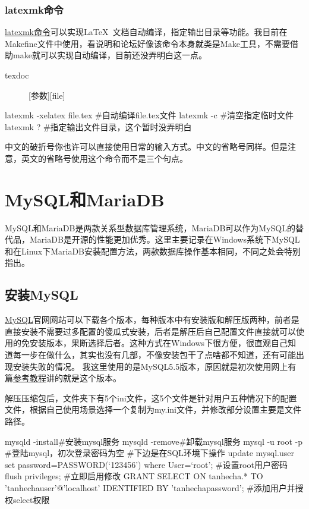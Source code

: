 \subsubsection{latexmk命令}
	\href{https://blog.csdn.net/bleedingfight/article/details/84946793?ops_request_misc=%257B%2522request%255Fid%2522%253A%2522a782193c5e5af7bfb740173a44657da1%2522%252C%2522scm%2522%253A%252220140713.130102334..%2522%257D&request_id=a782193c5e5af7bfb740173a44657da1&biz_id=0&utm_medium=distribute.pc_search_result.none-task-blog-2~all~sobaiduend~default-1-84946793-null-null.142^v101^pc_search_result_base7&utm_term=latexmk&spm=1018.2226.3001.4187}{latexmk命令}可以实现\LaTeX\ 文档自动编译，指定输出目录等功能。我目前在Makefine文件中使用，看说明和论坛好像该命令本身就类是Make工具，不需要借助make就可以实现自动编译，目前还没弄明白这一点。
	\begin{description}
		\item[texdoc] [参数][file]
	\end{description}
\begin{shell}
latexmk -xelatex file.tex #自动编译file.tex文件
latexmk -c #清空指定临时文件
latexmk ? #指定输出文件目录，这个暂时没弄明白
\end{shell}

中文的破折号你也许可以直接使用日常的输入方式。中文的省略号同样。但是注意，英文的省略号使用这个命令而不是三个句点。
\section{MySQL和MariaDB}
MySQL和MariaDB是两款关系型数据库管理系统，MariaDB可以作为MySQL的替代品，MariaDB是开源的性能更加优秀。这里主要记录在Windows系统下MySQL和在Linux下MariaDB安装配置方法，两款数据库操作基本相同，不同之处会特别指出。
\subsection{安装MySQL}
\href{https://downloads.mysql.com/archives/community/}{MySQL}官网网站可以下载各个版本，每种版本中有安装版和解压版两种，前者是直接安装不需要过多配置的傻瓜式安装，后者是解压后自己配置文件直接就可以使用的免安装版本，果断选择后者。这种方式在Windows下很方便，很直观自己知道每一步在做什么，其实也没有几部，不像安装包干了点啥都不知道，还有可能出现安装失败的情况。
我这里使用的是MySQL5.5版本，原因就是初次使用网上有篇\href{https://blog.csdn.net/qq_30061785/article/details/102504115?spm=1001.2014.3001.5506}{参考教程}讲的就是这个版本。

解压压缩包后，文件夹下有5个ini文件，这5个文件是针对用户五种情况下的配置文件，根据自己使用场景选择一个复制为my.ini文件，并修改部分设置主要是文件路径。
\begin{shell}
mysqld -install#安装mysql服务
mysqld -remove#卸载mysql服务
mysql -u root -p #登陆mysql，初次登录密码为空
#下边是在SQL环境下操作
update mysql.user set password=PASSWORD(‘123456’) where User=‘root’;
#设置root用户密码
flush privileges;
#立即启用修改
GRANT SELECT ON tanhecha.* TO 'tanhechauser'@'localhost' IDENTIFIED BY 'tanhechapassword';
#添加用户并授权select权限
\end{shell}
